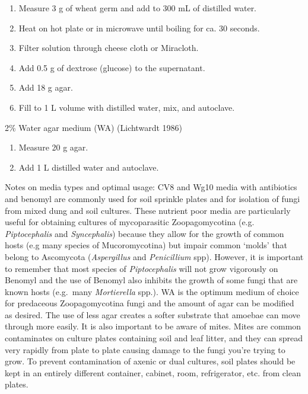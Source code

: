\documentclass[]{book}
\providecommand{\tightlist}{%
  \setlength{\itemsep}{0pt}\setlength{\parskip}{0pt}}
\begin{document}
\begin{enumerate}
\def\labelenumi{\arabic{enumi}.}
\tightlist
\item
  Measure 3 g of wheat germ and add to 300 mL of distilled water.
\item
  Heat on hot plate or in microwave until boiling for ca. 30 seconds.
\item
  Filter solution through cheese cloth or Miracloth.
\item
  Add 0.5 g of dextrose (glucose) to the supernatant.
\item
  Add 18 g agar.
\item
  Fill to 1 L volume with distilled water, mix, and autoclave.
\end{enumerate}

{2\% Water agar medium} (WA) (Lichtwardt 1986)

\begin{enumerate}
\def\labelenumi{\arabic{enumi}.}
\tightlist
\item
  Measure 20 g agar.
\item
  Add 1 L distilled water and autoclave.
\end{enumerate}

Notes on media types and optimal usage: CV8 and Wg10 media with
antibiotics and benomyl are commonly used for soil sprinkle plates and
for isolation of fungi from mixed dung and soil cultures. These nutrient
poor media are particularly useful for obtaining cultures of
mycoparasitic Zoopagomycotina (e.g. \emph{Piptocephalis} and
\emph{Syncephalis}) because they allow for the growth of common hosts
(e.g many species of Mucoromycotina) but impair common `molds' that
belong to Ascomycota (\emph{Aspergillus} and \emph{Penicillium} spp).
However, it is important to remember that most species of
\emph{Piptocephalis} will not grow vigorously on Benomyl and the use of
Benomyl also inhibits the growth of some fungi that are known hosts
(e.g.~many \emph{Mortierella} spp.). WA is the optimum medium of choice
for predaceous Zoopagomycotina fungi and the amount of agar can be
modified as desired. The use of less agar creates a softer substrate
that amoebae can move through more easily. It is also important to be
aware of mites. Mites are common contaminates on culture plates
containing soil and leaf litter, and they can spread very rapidly from
plate to plate causing damage to the fungi you're trying to grow. To
prevent contamination of axenic or dual cultures, soil plates should be
kept in an entirely different container, cabinet, room, refrigerator,
etc. from clean plates.
\end{document}
